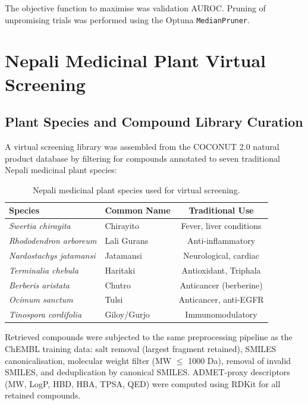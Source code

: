 The objective function to maximise was validation AUROC. Pruning of unpromising
trials was performed using the Optuna \texttt{MedianPruner}.

\section{Nepali Medicinal Plant Virtual Screening}

\subsection{Plant Species and Compound Library Curation}

A virtual screening library was assembled from the COCONUT 2.0 natural product
database \parencite{sorokina2021coconut} by filtering for compounds annotated to
seven traditional Nepali medicinal plant species:

\begin{table}[H]
\centering
\caption{Nepali medicinal plant species used for virtual screening.}
\label{tab:plants}
\begin{tabular}{llc}
\toprule
\textbf{Species} & \textbf{Common Name} & \textbf{Traditional Use} \\
\midrule
\textit{Swertia chirayita}     & Chirayito       & Fever, liver conditions \\
\textit{Rhododendron arboreum} & Lali Gurans     & Anti-inflammatory        \\
\textit{Nardostachys jatamansi}& Jatamansi       & Neurological, cardiac    \\
\textit{Terminalia chebula}    & Haritaki        & Antioxidant, Triphala    \\
\textit{Berberis aristata}     & Chutro          & Anticancer (berberine)   \\
\textit{Ocimum sanctum}        & Tulsi           & Anticancer, anti-EGFR    \\
\textit{Tinospora cordifolia}  & Giloy/Gurjo     & Immunomodulatory         \\
\bottomrule
\end{tabular}
\end{table}

Retrieved compounds were subjected to the same preprocessing pipeline as the
ChEMBL training data: salt removal (largest fragment retained), SMILES
canonicalisation, molecular weight filter (MW $\leq$ 1000 Da), removal of
invalid SMILES, and deduplication by canonical SMILES. ADMET-proxy descriptors
(MW, LogP, HBD, HBA, TPSA, QED) were computed using RDKit for all retained
compounds.

